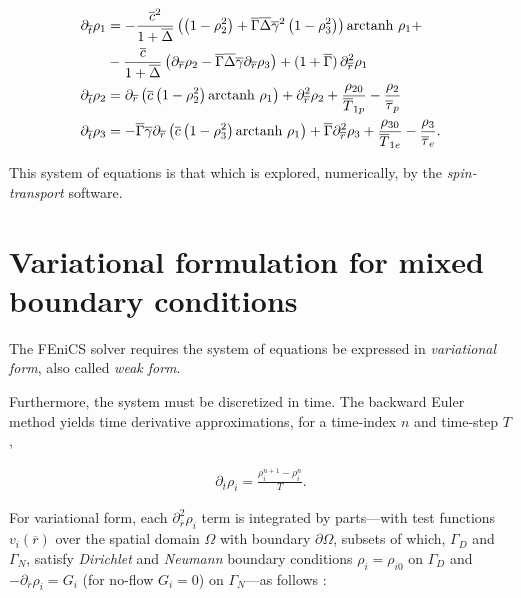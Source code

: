 \documentclass[%
oneside,                 %
final,                   %
10pt]{article}
\begin{document}
\begin{align} 
	\partial_{\overline{t}} \rho_1 
	&=
	-\frac{\overline{c}^2}{1+\overline{\Delta}}
	\left(
		\left(
			1 - \rho_2^2
		\right)
		+
		\overline{\Gamma}\overline{\Delta}\overline{\gamma}^2
		\left(
			1 - \rho_3^2
		\right)
	\right)
	\text{arctanh }\rho_1 + 
	\nonumber\\
	&-\frac{\overline{c}}{1+\overline{\Delta}}
	\left(
		\partial_{\overline{r}} \rho_2 - \overline{\Gamma}\overline{\Delta}\overline{\gamma} \partial_{\overline{r}} \rho_3
	\right)
	+ ( 1 + \overline{\Gamma} )\, \partial_{\overline{r}}^2 \rho_1
	\label{eq:btransport1b} \\
	\partial_{\overline{t}} \rho_2 
	&=
	\partial_{\overline{r}}
	\left(
		\overline{c}
		\left( 1 - \rho_2^2 \right)
		\text{arctanh }\rho_1
	\right)
	+ \partial_{\overline{r}}^2 \rho_2
	+ \frac{\rho_{20}}{\overline{T}_{1p}} 
	- \frac{\rho_2}{\overline{\tau}_p}
	\label{eq:btransport2b} \\
	\partial_{\overline{t}} \rho_3
	&=
	- 
	\overline{\Gamma}\overline{\gamma}
	\partial_{\overline{r}}
	\left(
		\overline{c}
		\left( 1 - \rho_3^2 \right)
		\text{arctanh }\rho_1
	\right)
	+ \overline{\Gamma} \partial_{\overline{r}}^2 \rho_3
	+ \frac{\rho_{30}}{\overline{T}_{1e}} 
	- \frac{\rho_3}{\overline{\tau}_e} .
	\label{eq:btransport3b}
\end{align}

This system of equations is that which is explored, numerically, by the \emph{spin-transport} software.

\section{Variational formulation for mixed boundary conditions}
\label{variational_form}

The FEniCS solver requires the system of equations be expressed in \emph{variational form}, also called \emph{weak form}.

Furthermore, the system must be discretized in time. The backward Euler method yields time derivative approximations, for a time-index $n$ and time-step $T$,

\begin{align}
	\partial_{\overline{t}} \rho_i = 
	\frac{\rho_i^{n+1} - \rho_i^n}{T}.
\end{align}

For variational form, each $\partial_{\overline{r}}^2 \rho_i$ term is integrated by parts---with test functions $v_i(\overline{r})$ over the spatial domain $\Omega$ with boundary $\partial\Omega$, subsets of which, $\Gamma_D$ and $\Gamma_N$, satisfy \emph{Dirichlet} and \emph{Neumann} boundary conditions $\rho_i = \rho_{i0}$ on $\Gamma_D$ and $-\partial_{\overline{r}} \rho_i = G_i$ (for no-flow $G_i = 0$) on $\Gamma_N$---as follows \cite[\S~4.1.1--4.1.2]{Langtangen2017}:
\end{document}
